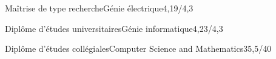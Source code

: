 
{Maîtrise de type recherche}{Génie électrique}{4,19/4,3}

{Diplôme d'études universitaires}{Génie informatique}{4,23/4,3}

{Diplôme d'études collégiales}{Computer Science and Mathematics}{35,5/40}
